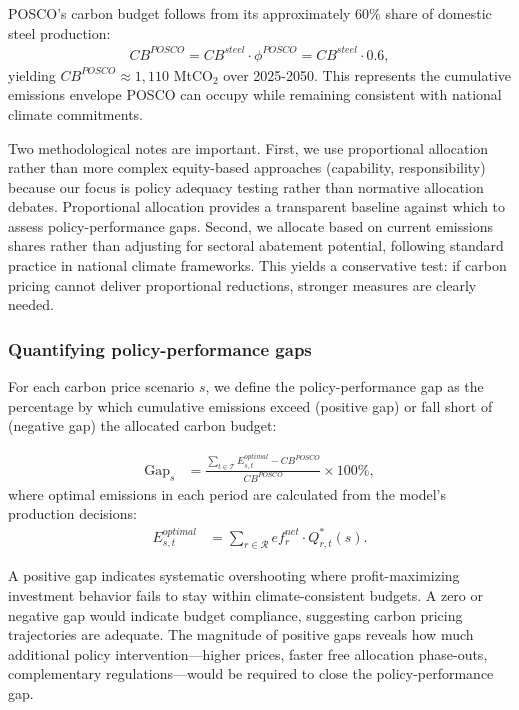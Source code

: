 \documentclass[preprint,1p,authoryear]{elsarticle}
\begin{document}
POSCO's carbon budget follows from its approximately 60\% share of domestic steel production:
\begin{align}
CB^{POSCO} = CB^{steel} \cdot \phi^{POSCO} = CB^{steel} \cdot 0.6, \label{eq:posco_budget}
\end{align}
yielding $CB^{POSCO} \approx 1{,}110$ MtCO$_2$ over 2025-2050. This represents the cumulative emissions envelope POSCO can occupy while remaining consistent with national climate commitments.

Two methodological notes are important. First, we use proportional allocation rather than more complex equity-based approaches (capability, responsibility) because our focus is policy adequacy testing rather than normative allocation debates. Proportional allocation provides a transparent baseline against which to assess policy-performance gaps. Second, we allocate based on current emissions shares rather than adjusting for sectoral abatement potential, following standard practice in national climate frameworks. This yields a conservative test: if carbon pricing cannot deliver proportional reductions, stronger measures are clearly needed.

\subsubsection{Quantifying policy-performance gaps}

For each carbon price scenario $s$, we define the policy-performance gap as the percentage by which cumulative emissions exceed (positive gap) or fall short of (negative gap) the allocated carbon budget:

\begin{align}
\text{Gap}_s &= \frac{\sum_{t \in \mathcal{T}} E_{s,t}^{optimal} - CB^{POSCO}}{CB^{POSCO}} \times 100\%, \label{eq:gap}
\end{align}
where optimal emissions in each period are calculated from the model's production decisions:
\begin{align}
E_{s,t}^{optimal} &= \sum_{r \in \mathcal{R}} ef_r^{net} \cdot Q_{r,t}^*(s). \label{eq:optimal_emissions}
\end{align}

A positive gap indicates systematic overshooting where profit-maximizing investment behavior fails to stay within climate-consistent budgets. A zero or negative gap would indicate budget compliance, suggesting carbon pricing trajectories are adequate. The magnitude of positive gaps reveals how much additional policy intervention—higher prices, faster free allocation phase-outs, complementary regulations—would be required to close the policy-performance gap.
\end{document}
